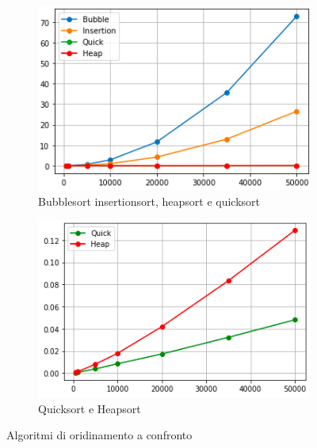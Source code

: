 \documentclass[12pt,a4paper]{report}
\begin{document}
\begin{figure}[htbp]
     \centering
     \begin{subfigure}[t]{0.45\textwidth}
         \centering
         \includegraphics[width=\textwidth]{Img/GraficiSorting/AllSorting.png}
         \caption{Bubblesort insertionsort, heapsort e quicksort}
         \label{Fig:AllSortingAlg}
     \end{subfigure}
     \hfill
     \begin{subfigure}[t]{0.45\textwidth}
         \centering
         \includegraphics[width=\textwidth]{Img/GraficiSorting/QHSorting.png}
         \caption{Quicksort e Heapsort}
         \label{Fig:QHSort}
     \end{subfigure}

   \caption{Algoritmi di oridinamento a confronto}
   \label{Fig:AllSort}
\end{figure}
\end{document}

